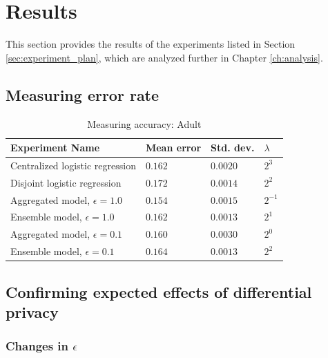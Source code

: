 
\section{Results}
\label{sec:experiment_results}

	This section provides the results of the experiments listed in Section \ref{sec:experiment_plan}, which are analyzed further in Chapter \ref{ch:analysis}.

\subsection{Measuring error rate}

\begin{table}[H]
			\centering
	\begin{tabular}{|l|l|l|l|}

		{\bf Experiment Name}            & {\bf Mean error} & {\bf Std. dev.} & $\lambda$ \\
		\hline
		Centralized logistic regression  & $0.162$          & $0.0020$        & $2^3$     \\
		Disjoint logistic regression     & $0.172$          & $0.0014$        & $2^2$     \\
		Aggregated model, $\epsilon=1.0$ & $0.154$          & $0.0015$        & $2^{-1}$  \\
		Ensemble model, $\epsilon=1.0$   & $0.162$          & $0.0013$        & $2^1$     \\
		Aggregated model, $\epsilon=0.1$ & $0.160$          & $0.0030$        & $2^0$     \\
		Ensemble model, $\epsilon=0.1$   & $0.164$          & $0.0013$        & $2^2$    
	\end{tabular}
	\caption{Measuring accuracy: Adult}
	\label{tab:results_measuring_accuracy}
\end{table}

\subsection{Confirming expected effects of differential privacy}
\subsubsection{Changes in $\epsilon$}

